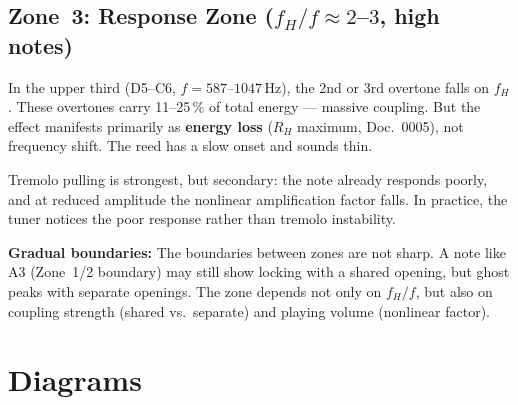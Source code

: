 \documentclass[11pt,a4paper]{article}
\begin{document}
\subsection{\textcolor{zone3red}{Zone~3: Response Zone ($f_H/f \approx 2$--$3$, high notes)}}

In the upper third (D5--C6, $f = 587$--$1047$\,Hz), the 2nd or 3rd overtone falls on $f_H$. These overtones carry 11--25\,\% of total energy --- massive coupling. But the effect manifests primarily as \textbf{energy loss} ($R_H$ maximum, Doc.~0005), not frequency shift. The reed has a slow onset and sounds thin.

Tremolo pulling is strongest, but secondary: the note already responds poorly, and at reduced amplitude the nonlinear amplification factor falls. In practice, the tuner notices the poor response rather than tremolo instability.

\begin{table}[H]
\centering\small
\caption{Overview of the three zones}
\end{table}

\begin{warnbox}
\textbf{Gradual boundaries:} The boundaries between zones are not sharp. A note like A3 (Zone~1/2 boundary) may still show locking with a shared opening, but ghost peaks with separate openings. The zone depends not only on $f_H/f$, but also on coupling strength (shared vs.\ separate) and playing volume (nonlinear factor).
\end{warnbox}

\section{Diagrams}
\end{document}
